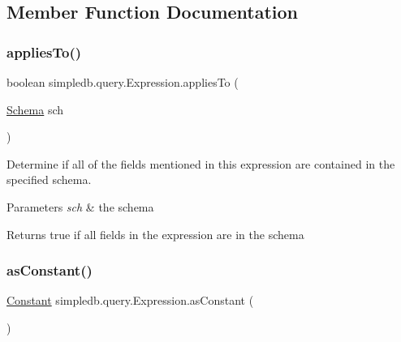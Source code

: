 \subsection{Member Function Documentation}
\mbox{\label{classsimpledb_1_1query_1_1Expression_a6ff0d7022de12290e82bd0aabd9a0449}} 
\subsubsection{\texorpdfstring{applies\+To()}{appliesTo()}}
{\footnotesize\ttfamily boolean simpledb.\+query.\+Expression.\+applies\+To (\begin{DoxyParamCaption}\item[{\hyperlink{classsimpledb_1_1record_1_1Schema}{Schema}}]{sch }\end{DoxyParamCaption})\hspace{0.3cm}{\ttfamily [inline]}}

Determine if all of the fields mentioned in this expression are contained in the specified schema. 
\begin{DoxyParams}{Parameters}
{\em sch} & the schema \\
\hline
\end{DoxyParams}
\begin{DoxyReturn}{Returns}
true if all fields in the expression are in the schema 
\end{DoxyReturn}
\mbox{\label{classsimpledb_1_1query_1_1Expression_a493dcabb0b3952c3188ab2de5814b344}} 
\subsubsection{\texorpdfstring{as\+Constant()}{asConstant()}}
{\footnotesize\ttfamily \hyperlink{classsimpledb_1_1query_1_1Constant}{Constant} simpledb.\+query.\+Expression.\+as\+Constant (\begin{DoxyParamCaption}{ }\end{DoxyParamCaption})\hspace{0.3cm}{\ttfamily [inline]}}

